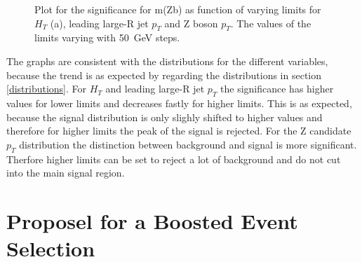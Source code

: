 \begin{figure}[h]
    \centering
    \caption{Plot for the significance for m(Zb) as function of varying limits for $H_{T}$ (a), leading large-R jet $p_{T}$ and Z boson $p_{T}$.
    The values of the limits varying with \SI{50}{GeV} steps.}
    \label{mZbcut}   
\end{figure}

The graphs are consistent with the distributions for the different variables, because the trend is as expected by regarding the distributions in section \ref{distributions}.
For $H_{T}$ and leading large-R jet $p_{T}$ the significance has higher values for lower limits and decreases fastly for higher limits.
This is as expected, because the signal distribution is only slighly shifted to higher values and therefore for higher limits the peak of the signal is rejected.
For the Z candidate $p_{T}$ distribution the distinction between background and signal is more significant.
Therfore higher limits can be set to reject a lot of background and do not cut into the main signal region.










\section{Proposel for a Boosted Event Selection}

